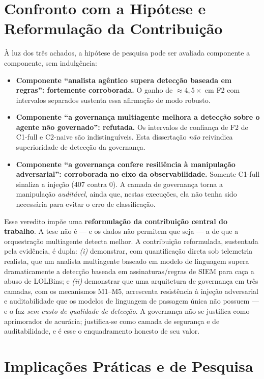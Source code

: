 \section{Confronto com a Hipótese e Reformulação da Contribuição}
\label{sec:disc-hipotese}

À luz dos três achados, a hipótese de pesquisa pode ser avaliada componente a
componente, sem indulgência:

\begin{itemize}
    \item \textbf{Componente ``analista agêntico supera detecção baseada em
    regras'': fortemente corroborada.} O ganho de $\approx 4{,}5\times$ em F2 com
    intervalos separados sustenta essa afirmação de modo robusto.
    \item \textbf{Componente ``a governança multiagente melhora a detecção sobre
    o agente não governado'': refutada.} Os intervalos de confiança de F2 de
    C1-full e C2-naive são indistinguíveis. Esta dissertação \emph{não} reivindica
    superioridade de detecção da governança.
    \item \textbf{Componente ``a governança confere resiliência à manipulação
    adversarial'': corroborada no eixo da observabilidade.} Somente C1-full
    sinaliza a injeção (407 contra 0). A camada de governança torna a manipulação
    \emph{auditável}, ainda que, nestas execuções, ela não tenha sido necessária
    para evitar o erro de classificação.
\end{itemize}

Esse veredito impõe uma \textbf{reformulação da contribuição central do
trabalho}. A tese não é --- e os dados não permitem que seja --- a de que a
orquestração multiagente detecta melhor. A contribuição reformulada, sustentada
pela evidência, é dupla: \emph{(i)} demonstrar, com quantificação direta sob
telemetria realista, que um analista multiagente baseado em modelo de linguagem
supera dramaticamente a detecção baseada em assinaturas/regras de SIEM para caça a
abuso de LOLBins; e \emph{(ii)} demonstrar que uma arquitetura de governança em
três camadas, com os mecanismos M1--M5, acrescenta resistência à injeção
adversarial e auditabilidade que os modelos de linguagem de passagem única não
possuem --- e o faz \emph{sem custo de qualidade de detecção}. A governança não
se justifica como aprimorador de acurácia; justifica-se como camada de segurança e
de auditabilidade, e é esse o enquadramento honesto de seu valor.

\section{Implicações Práticas e de Pesquisa}
\label{sec:disc-implicacoes}

